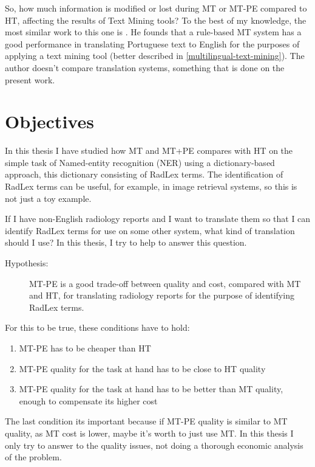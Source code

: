 So, how much information is modified or lost during MT or MT-PE compared to HT, affecting the results of Text Mining tools? To the best of my knowledge, the most similar work to this one is \citep{Castilla2007a}. He founds that a rule-based MT system has a good performance in translating Portuguese text to English for the purposes of applying a text mining tool (better described in \ref{multilingual-text-mining}). The author doesn't compare translation systems, something that is done on the present work.

\section{Objectives}

In this thesis I have studied how MT and MT+PE compares with HT on the simple task of Named-entity recognition (NER) using a dictionary-based approach, this dictionary consisting of RadLex terms. The identification of RadLex terms can be useful, for example, in image retrieval \citep{Gerstmair2012} systems, so this is not just a toy example. 

If I have non-English radiology reports and I want to translate them so that I can identify RadLex terms for use on some other system, what kind of translation should I use? In this thesis, I try to help to answer this question. 

\newcommand{\hypothesis}{
\begin{description}
	\item[Hypothesis:] MT-PE is a good trade-off between quality and cost, compared with MT and HT, for translating radiology reports for the purpose of identifying RadLex terms. 
\end{description}
}
\hypothesis

For this to be true, these conditions have to hold:

\begin{enumerate}
	\item MT-PE has to be cheaper than HT
	\item MT-PE quality for the task at hand has to be close to HT quality
	\item MT-PE quality for the task at hand has to be better than MT quality, enough to compensate its higher cost
\end{enumerate}

The last condition its important because if MT-PE quality is similar to MT quality, as MT cost is lower, maybe it's worth to just use MT. In this thesis I only try to answer to the quality issues, not doing a thorough economic analysis of the problem. 

